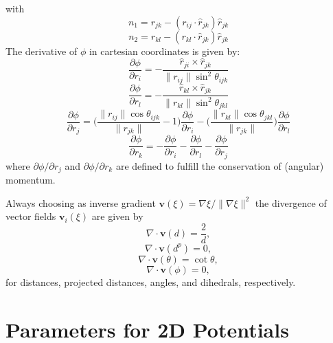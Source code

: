 with
\begin{equation}
  n_1 = r_{jk} - (r_{ij} \cdot \hat{r}_{jk})\hat{r}_{jk}
\end{equation}
\begin{equation}
  n_2 = r_{kl} - (r_{kl} \cdot \hat{r}_{jk})\hat{r}_{jk}
\end{equation}
The derivative of $\phi$ in cartesian coordinates is given by:
\begin{equation}
  \frac{\partial\phi}{\partial r_i} = - \frac{\hat{r}_{ji}\times\hat{r}_{jk}}{\|r_{ij}\|\sin^2\theta_{ijk}}
\end{equation}
\begin{equation}
  \frac{\partial\phi}{\partial r_l} = - \frac{\hat{r}_{kl}\times\hat{r}_{jk}}{\|r_{kl}\|\sin^2\theta_{jkl}}
\end{equation}
\begin{equation}
  \frac{\partial\phi}{\partial r_j} = \bigl(\frac{\|r_{ij} \| \cos\theta_{ijk}}{\|r_{jk} \|}-1\bigr) \frac{\partial\phi}{\partial r_i} - \bigl( \frac{\|r_{kl} \| \cos\theta_{jkl}}{\|r_{jk} \|}\bigr)\frac{\partial\phi}{\partial r_l}
\end{equation}
\begin{equation}
  \frac{\partial\phi}{\partial r_k} = - \frac{\partial\phi}{\partial r_i} - \frac{\partial\phi}{\partial r_l} - \frac{\partial\phi}{\partial r_j}
\end{equation}
where $\partial \phi/\partial r_j$ and $\partial \phi/\partial r_k$ are defined to fulfill the conservation of (angular) momentum.

Always choosing as inverse gradient $\textbf{v}(\xi) = \nabla \xi/\|\nabla \xi \| ^2$ the divergence of vector fields $\textbf{v}_i(\xi)$ are given by
\begin{equation}
  \nabla \cdot \textbf{v}(d) = \frac{2}{d},
\end{equation}
\begin{equation}
  \nabla \cdot \textbf{v}(d^p) = 0,
\end{equation}
\begin{equation}
  \nabla \cdot \textbf{v}(\theta) = \cot \theta,
\end{equation}
\begin{equation}
  \nabla \cdot \textbf{v}(\phi) = 0,
\end{equation}
for distances, projected distances, angles, and dihedrals, respectively.

\section{Parameters for 2D Potentials}
\label{sec:num examples}

